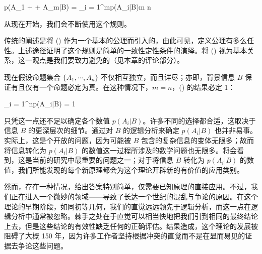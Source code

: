 \placeformula[2-85]
\startformula
p(A_1 + \cdots + A_m|B) = \sum_{i = 1}^{m}p(A_i|B)\le m \le n
\stopformula

从现在开始，我们会不断使用这个规则。

传统的阐述是将 (\in[2-85]) 作为一个基本的公理而引入的，由此可见，定义公理有多么任性。上述途径证明了这个规则是简单的一致性定性条件的演绎。将 (\in[2-85]) 视为基本关系，这一观点是我们要致力避免的（见本章的评论部分）。

现在假设命题集合 $\{A_1,\cdots,A_n\}$ 不仅相互独立，而且详尽；亦即，背景信息 $B$ 保证有且仅有一个命题必定为真。在这种情况下，$m = n$，(\in[2-85]) 的结果必定 1：

\placeformula[2-86]
\startformula
\sum_{i = 1}^{n}p(A_i|B) = 1
\stopformula

只凭这一点还不足以确定各个数值 $p(A_i|B)$。许多不同的选择都合适，这取决于信息 $B$ 的更深层次的细节。通过对 $B$ 的逻辑分析来确定 $p(A_i|B)$ 也并非易事。实际上，这是个开放的问题，因为可能被 $B$ 包含的复杂信息的变体无限多；故而将信息转化为 $p(A_i|B)$ 的数值这一过程所涉及的数学问题也无限多。将会看到，这是当前的研究中最重要的问题之一；对于将信息 $B$ 转化为 $p(A_i|B)$ 的数值，我们所能发现的每个新原理都会为这个理论开辟新的有价值的应用类别。

然而，存在一种情况，给出答案特别简单，仅需要已知原理的直接应用。不过，我们正在进入一个微妙的领域——导致了长达一个世纪的混乱与争论的原因。在这个理论的早期阶段，如同初等几何，我们的直觉远远领先于逻辑分析，而这一点在逻辑分析中通常被忽略。棘手之处在于直觉可以相当快地把我们引到相同的最终结论上去，但是这些结论的有效性缺乏任何的正确评估。结果造成，这个理论的发展被阻碍了大概 150 年，因为许多工作者坚持根据冲突的直觉而不是在显而易见的证据去争论这些问题。